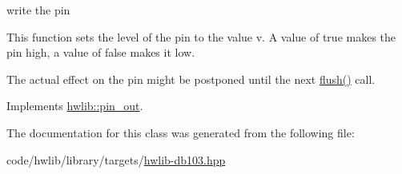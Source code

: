 write the pin

This function sets the level of the pin to the value v. A value of true makes the pin high, a value of false makes it low.

The actual effect on the pin might be postponed until the next \hyperlink{classdb103_1_1pin__out_ad94271fe261522bf18b35e084076c12d}{flush()} call. 

Implements \hyperlink{classhwlib_1_1pin__out_a8d260a70e503dcfb81987c408e170300}{hwlib\+::pin\+\_\+out}.



The documentation for this class was generated from the following file\+:\begin{DoxyCompactItemize}
\item 
code/hwlib/library/targets/\hyperlink{hwlib-db103_8hpp}{hwlib-\/db103.\+hpp}\end{DoxyCompactItemize}
